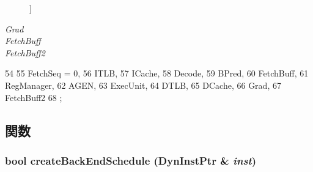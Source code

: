 \begin{Desc}
\begin{description}
{}]\item[{\em 
\hypertarget{namespaceThePipeline_a2a7d8e086edbca0402639d3b6b835286ace0971a4092973e63d9ec4bbb822afb4}{
Grad}
\label{namespaceThePipeline_a2a7d8e086edbca0402639d3b6b835286ace0971a4092973e63d9ec4bbb822afb4}
}]\item[{\em 
\hypertarget{namespaceThePipeline_a2a7d8e086edbca0402639d3b6b835286a096490ab52aafe3b36e9cc65ed2d139c}{
FetchBuff}
\label{namespaceThePipeline_a2a7d8e086edbca0402639d3b6b835286a096490ab52aafe3b36e9cc65ed2d139c}
}]\item[{\em 
\hypertarget{namespaceThePipeline_a2a7d8e086edbca0402639d3b6b835286ab3fbf950e2ed6aa86fc336872f3eef2f}{
FetchBuff2}
\label{namespaceThePipeline_a2a7d8e086edbca0402639d3b6b835286ab3fbf950e2ed6aa86fc336872f3eef2f}
}]\end{description}
\end{Desc}




\begin{DoxyCode}
54                       {
55        FetchSeq = 0,
56        ITLB,
57        ICache,
58        Decode,
59        BPred,
60        FetchBuff,
61        RegManager,
62        AGEN,
63        ExecUnit,
64        DTLB,
65        DCache,
66        Grad,
67        FetchBuff2
68     };
\end{DoxyCode}


\subsection{関数}
\hypertarget{namespaceThePipeline_abea63cbb0df7d307fa9c239e6fea49e5}{
\subsubsection[{createBackEndSchedule}]{\setlength{\rightskip}{0pt plus 5cm}bool createBackEndSchedule (DynInstPtr \& {\em inst})}}
\label{namespaceThePipeline_abea63cbb0df7d307fa9c239e6fea49e5}



